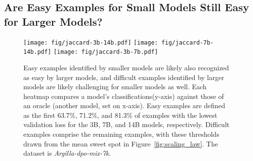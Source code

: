 \subsection{Are Easy Examples for Small Models Still Easy for Larger Models?}
\begin{figure}[!h]
    \centering
    \texttt{[image: fig/jaccard-3b-14b.pdf]}
    \texttt{[image: fig/jaccard-7b-14b.pdf]}
    \texttt{[image: fig/jaccard-3b-7b.pdf]}
    \caption{Easy examples identified by smaller models are likely also recognized as easy by larger models, and difficult examples identified by larger models are likely challenging for smaller models as well. Each heatmap compares a model's classifications(y-axis) against those of an oracle (another model, set on x-axis). Easy examples are defined as the first 63.7\%, 71.2\%, and 81.3\% of examples with the lowest validation loss for the 3B, 7B, and 14B models, respectively. Difficult examples comprise the remaining examples, with these thresholds drawn from the mean sweet spot in Figure~\ref{fig:scaling_law}. The dataset is \textit{Argilla-dpo-mix-7k}.}
    \label{fig:jaccard-3b-7b-14b}
\end{figure}

\clearpage
